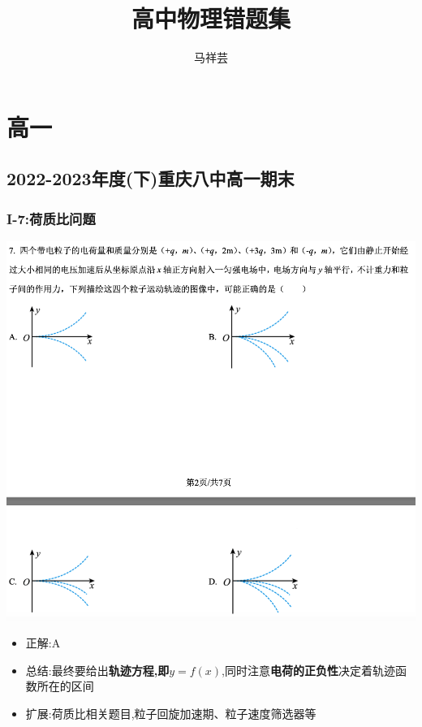 \documentclass{article}
\title{高中物理错题集}
\author{马祥芸}
\begin{document}
\maketitle
\tableofcontents
\newpage

\section{高一}

\subsection{2022-2023年度(下)重庆八中高一期末}

\subsubsection{I-7:荷质比问题}
\includegraphics[width=50em,keepaspectratio]{./pictures/1.1-1.png}

\begin{itemize}
    \item 正解:\quad A
    \item 总结:最终要给出\textbf{轨迹方程,即$ y = f(x) $},同时注意\textbf{电荷的正负性}决定着轨迹函数所在的区间
    \item 扩展:荷质比相关题目,粒子回旋加速期、粒子速度筛选器等
\end{itemize}
\end{document}
